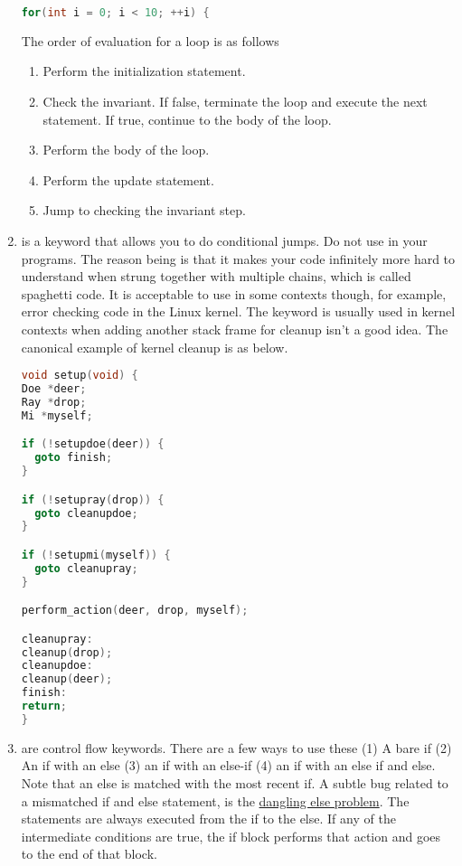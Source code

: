 \begin{enumerate}
\begin{lstlisting}[language=C]
for(int i = 0; i < 10; ++i) {
\end{lstlisting}

	      The order of evaluation for a  loop is as follows

	      \begin{enumerate}
		      \item Perform the initialization statement.
		      \item Check the invariant. If false, terminate the loop and execute the next statement. If true, continue to the body of the loop.
		      \item Perform the body of the loop.
		      \item Perform the update statement.
		      \item Jump to checking the invariant step.
	      \end{enumerate}

	    \item {} is a keyword that allows you to do conditional jumps.
        Do not use  in your programs.
        The reason being is that it makes your code infinitely more hard to understand when strung together with multiple chains, which is called spaghetti code.
        It is acceptable to use in some contexts though, for example, error checking code in the Linux kernel.
        The keyword is usually used in kernel contexts when adding another stack frame for cleanup isn't a good idea.
        The canonical example of kernel cleanup is as below.

\begin{lstlisting}[language=C]
void setup(void) {
Doe *deer;
Ray *drop;
Mi *myself;

if (!setupdoe(deer)) {
  goto finish;
}

if (!setupray(drop)) {
  goto cleanupdoe;
}

if (!setupmi(myself)) {
  goto cleanupray;
}

perform_action(deer, drop, myself);

cleanupray:
cleanup(drop);
cleanupdoe:
cleanup(deer);
finish:
return;
}
\end{lstlisting}

	    \item {} are control flow keywords.
        There are a few ways to use these (1) A bare if (2) An if with an else (3) an if with an else-if (4) an if with an else if and else.
        Note that an else is matched with the most recent if.
        A subtle bug related to a mismatched if and else statement, is the \href{https://en.wikipedia.org/wiki/Dangling\_else}{dangling else problem}.
        The statements are always executed from the if to the else.
        If any of the intermediate conditions are true, the if block performs that action and goes to the end of that block.


\end{enumerate}
